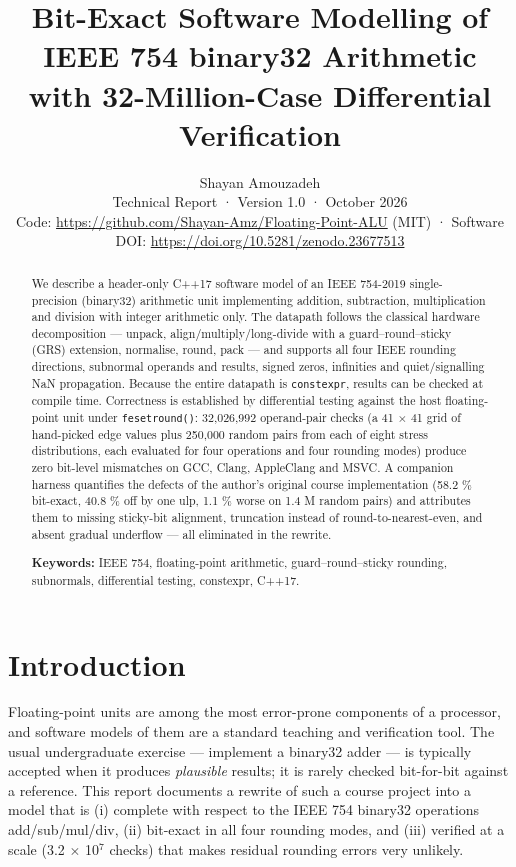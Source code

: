 \documentclass[11pt,a4paper]{article}
\title{Bit-Exact Software Modelling of IEEE 754 binary32 Arithmetic with 32-Million-Case Differential Verification}
\author{Shayan Amouzadeh\\[2pt]\small Technical Report · Version 1.0 · October 2026\\ \small Code: \url{https://github.com/Shayan-Amz/Floating-Point-ALU} (MIT) · Software DOI: \url{https://doi.org/10.5281/zenodo.23677513}}
\date{}
\begin{document}
\maketitle

\begin{abstract}
We describe a header-only C++17 software model of an IEEE 754-2019 single-precision (binary32) arithmetic unit implementing addition, subtraction, multiplication and division with integer arithmetic only. The datapath follows the classical hardware decomposition — unpack, align/multiply/long-divide with a guard–round–sticky (GRS) extension, normalise, round, pack — and supports all four IEEE rounding directions, subnormal operands and results, signed zeros, infinities and quiet/signalling NaN propagation. Because the entire datapath is \texttt{constexpr}, results can be checked at compile time. Correctness is established by differential testing against the host floating-point unit under \texttt{fesetround()}: 32,026,992 operand-pair checks (a 41 $\times$ 41 grid of hand-picked edge values plus 250,000 random pairs from each of eight stress distributions, each evaluated for four operations and four rounding modes) produce zero bit-level mismatches on GCC, Clang, AppleClang and MSVC. A companion harness quantifies the defects of the author's original course implementation (58.2 \% bit-exact, 40.8 \% off by one ulp, 1.1 \% worse on 1.4 M random pairs) and attributes them to missing sticky-bit alignment, truncation instead of round-to-nearest-even, and absent gradual underflow — all eliminated in the rewrite.

\textbf{Keywords:} IEEE 754, floating-point arithmetic, guard–round–sticky rounding, subnormals, differential testing, constexpr, C++17.
\end{abstract}
\section{Introduction}
Floating-point units are among the most error-prone components of a processor, and software models of them are a standard teaching and verification tool. The usual undergraduate exercise — implement a binary32 adder — is typically accepted when it produces \emph{plausible} results; it is rarely checked bit-for-bit against a reference. This report documents a rewrite of such a course project into a model that is (i) complete with respect to the IEEE 754 binary32 operations add/sub/mul/div, (ii) bit-exact in all four rounding modes, and (iii) verified at a scale (3.2 $\times$ 10$^{7}$ checks) that makes residual rounding errors very unlikely.
\end{document}
